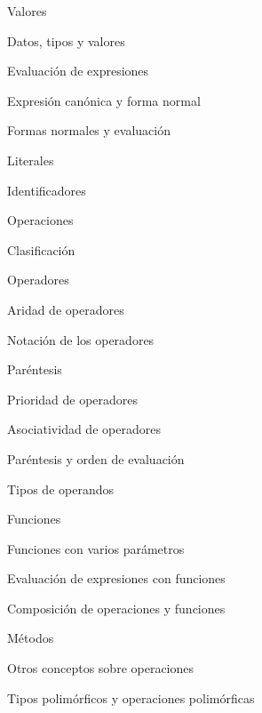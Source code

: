 \begin{longenum}
\begin{longenum}
\begin{longenum}
        \end{longenum}
        \item Valores
        \begin{longenum}
            \item Datos, tipos y valores
            \item Evaluación de expresiones
            \item Expresión canónica y forma normal
            \item Formas normales y evaluación
            \item Literales
            \item Identificadores
        \end{longenum}
        \item Operaciones
        \begin{longenum}
            \item Clasificación
            \item Operadores
            \begin{longenum}
                \item Aridad de operadores
                \item Notación de los operadores
                \item Paréntesis
                \item Prioridad de operadores
                \item Asociatividad de operadores
                \item Paréntesis y orden de evaluación
                \item Tipos de operandos
            \end{longenum}
            \item Funciones
            \begin{longenum}
                \item Funciones con varios parámetros
                \item Evaluación de expresiones con funciones
                \item Composición de operaciones y funciones
            \end{longenum}
            \item Métodos
        \end{longenum}
        \item Otros conceptos sobre operaciones
        \begin{longenum}
            \item Tipos polimórficos y operaciones polimórficas

\end{longenum}
\end{longenum}
\end{longenum}
